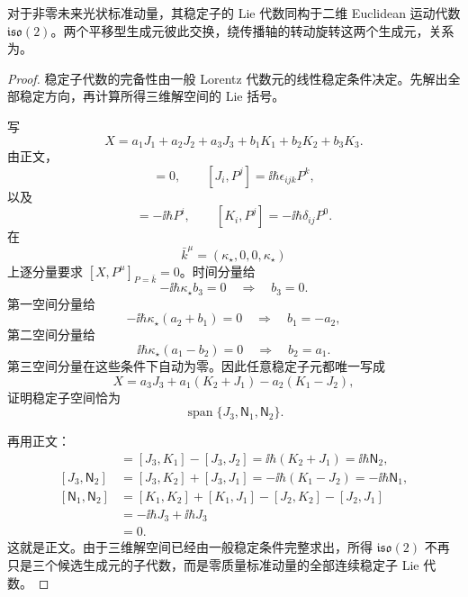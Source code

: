 \begin{theorem}
对于非零未来光状标准动量，其稳定子的 Lie 代数同构于二维 Euclidean 运动代数 $\mathfrak{iso}(2)$。两个平移型生成元彼此交换，绕传播轴的转动旋转这两个生成元，关系为。
\end{theorem}
\begin{proof}
稳定子代数的完备性由一般 Lorentz 代数元的线性稳定条件决定。先解出全部稳定方向，再计算所得三维解空间的 Lie 括号。

写
\begin{equation*}
 X=a_1J_1+a_2J_2+a_3J_3
 +b_1K_1+b_2K_2+b_3K_3.
\end{equation*}
由正文，
\begin{equation*}
 [J_i,P^0]=0,
 \qquad
 [J_i,P^j]=\ii\hbar\epsilon_{ijk}P^k,
\end{equation*}
以及
\begin{equation*}
 [K_i,P^0]=-\ii\hbar P^i,
 \qquad
 [K_i,P^j]=-\ii\hbar\delta_{ij}P^0.
\end{equation*}
在
\begin{equation*}
 \bar k^\mu=(\kappa_\star,0,0,\kappa_\star)
\end{equation*}
上逐分量要求 $[X,P^\mu]_{P=\bar k}=0$。时间分量给
\begin{equation*}
 -\ii\hbar\kappa_\star b_3=0
 \quad\Longrightarrow\quad b_3=0.
\end{equation*}
第一空间分量给
\begin{equation*}
 -\ii\hbar\kappa_\star(a_2+b_1)=0
 \quad\Longrightarrow\quad b_1=-a_2,
\end{equation*}
第二空间分量给
\begin{equation*}
 \ii\hbar\kappa_\star(a_1-b_2)=0
 \quad\Longrightarrow\quad b_2=a_1.
\end{equation*}
第三空间分量在这些条件下自动为零。因此任意稳定子元都唯一写成
\begin{equation*}
 X=a_3J_3+a_1(K_2+J_1)-a_2(K_1-J_2),
\end{equation*}
证明稳定子空间恰为
\begin{equation*}
 \operatorname{span}\{J_3,\mathsf N_1,\mathsf N_2\}.
\end{equation*}

再用正文：
\begin{align*}
 [J_3,\mathsf N_1]
 &=[J_3,K_1]-[J_3,J_2]
 =\ii\hbar(K_2+J_1)
 =\ii\hbar\mathsf N_2,\\
 [J_3,\mathsf N_2]
 &=[J_3,K_2]+[J_3,J_1]
 =-\ii\hbar(K_1-J_2)
 =-\ii\hbar\mathsf N_1,\\
 [\mathsf N_1,\mathsf N_2]
 &=[K_1,K_2]+[K_1,J_1]-[J_2,K_2]-[J_2,J_1]\\
 &=-\ii\hbar J_3+\ii\hbar J_3\\
 &=0.
\end{align*}
这就是正文。由于三维解空间已经由一般稳定条件完整求出，所得 $\mathfrak{iso}(2)$ 不再只是三个候选生成元的子代数，而是零质量标准动量的全部连续稳定子 Lie 代数。
\end{proof}

